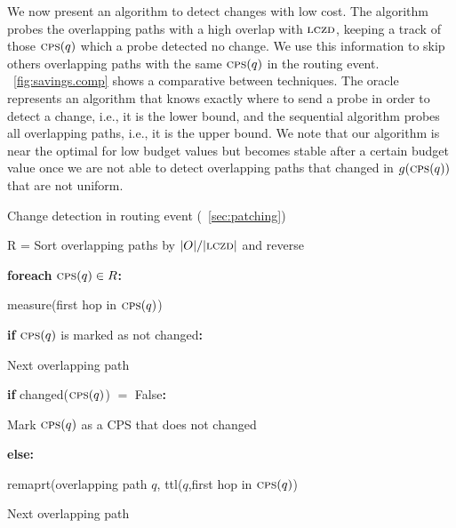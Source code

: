 We now present an algorithm to detect
changes with low cost. The algorithm probes the overlapping paths with
a high overlap with $\mathrm{\textsc{lczd}}$, keeping a track of those $\mathrm{\textsc{cps}}(q)$ which a probe
detected no change. We use this information to skip others overlapping paths 
with the same $\mathrm{\textsc{cps}}(q)$ in the routing event. \figstr~\ref{fig:savings.comp}
shows a comparative between techniques. The oracle represents an algorithm that
knows exactly where to send a probe in order to detect a change, i.e., 
it is the lower bound, and the sequential algorithm probes all overlapping paths,
i.e., it is the upper bound. We note that our algorithm is near the optimal
for low budget values but becomes stable after a certain budget value
once we are not able to detect overlapping paths that changed in $g(\mathrm{\textsc{cps}}(q))$ that 
are not uniform.  

    


\begin{algorithm}[h]
\caption{Change detection in routing event (\secstr~\ref{sec:patching})}

R = Sort overlapping paths by $|O|/|\mathrm{\textsc{lczd}}|$ and reverse\;

\textbf{foreach} $\mathrm{\textsc{cps}}(q) \in R$\textbf{:} 

\Indp
measure(first hop in $\mathrm{\textsc{cps}}(q)$)

\textbf{if} $\mathrm{\textsc{cps}}(q)$ is marked as not changed\textbf{:}
  
    \Indp
    Next overlapping path\;
    \Indm

\textbf{if} changed($\mathrm{\textsc{cps}}(q)$) $=$ False\textbf{:}
    
    \Indp
    Mark $\mathrm{\textsc{cps}}(q)$ as a CPS that does not changed\;
    \Indm

\textbf{else:}
    
    \Indp
    remaprt(overlapping path $q$, ttl($q$,first hop in $\mathrm{\textsc{cps}}(q)$)\;
    \Indm

Next overlapping path\;

\end{algorithm}

